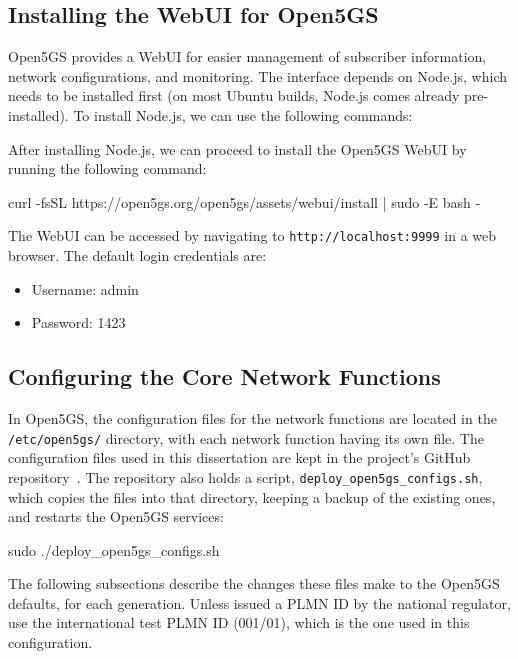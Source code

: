 \subsection{Installing the WebUI for Open5GS}
\label{sec:Installing_WebUI_for_Open5GS}
Open5GS provides a WebUI for easier management of subscriber information, network configurations, and monitoring. The interface depends on Node.js, which needs to be installed first (on most Ubuntu builds, Node.js comes already pre-installed).
To install Node.js, we can use the following commands:
After installing Node.js, we can proceed to install the Open5GS WebUI by running the following command:
\begin{code}
curl -fsSL https://open5gs.org/open5gs/assets/webui/install |
sudo -E bash -
\end{code}
The WebUI can be accessed by navigating to \texttt{http://localhost:9999} in a web browser. The default login credentials are:
\begin{itemize}
    \item Username: admin
    \item Password: 1423
\end{itemize}

\subsection{Configuring the Core Network Functions}
\label{sec:Configuring_Open5GS_Components}
In Open5GS, the configuration files for the network functions are located in the \texttt{/etc/open5gs/} directory, with each network function having its own file. The configuration files used in this dissertation are kept in the project's GitHub repository~\cite{thesis_repo}. The repository also holds a script, \texttt{deploy\_open5gs\_configs.sh}, which copies the files into that directory, keeping a backup of the existing ones, and restarts the Open5GS services:
\begin{code}
sudo ./deploy_open5gs_configs.sh
\end{code}
The following subsections describe the changes these files make to the Open5GS defaults, for each generation. Unless issued a \gls{PLMN} ID by the national regulator, use the international test \gls{PLMN} ID (001/01), which is the one used in this configuration.

